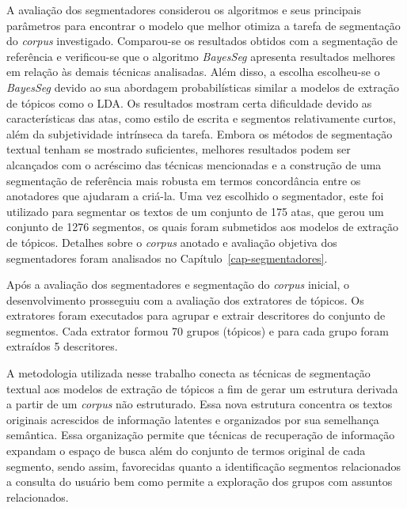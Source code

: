A avaliação dos segmentadores considerou os algoritmos e seus principais parâmetros para encontrar o modelo que melhor otimiza a tarefa de segmentação do \textit{corpus} investigado. Comparou-se os resultados obtidos com a segmentação de referência e verificou-se que o algoritmo \textit{BayesSeg} apresenta resultados melhores em relação às demais técnicas analisadas. Além disso, a escolha escolheu-se o \textit{BayesSeg} devido ao sua abordagem probabilísticas similar a modelos de extração de tópicos como o LDA. 
Os resultados mostram certa dificuldade devido as características das atas, como estilo de escrita e segmentos relativamente curtos, além da subjetividade intrínseca da tarefa.
Embora os métodos de segmentação textual tenham se mostrado suficientes, melhores resultados podem ser alcançados com o acréscimo das técnicas mencionadas e a construção de uma segmentação de referência mais robusta em termos concordância entre os anotadores que ajudaram a criá-la.
Uma vez escolhido o segmentador, este foi utilizado para segmentar os textos de um conjunto de 175 atas, que gerou um conjunto de 1276 segmentos, os quais foram submetidos aos modelos de extração de tópicos.
Detalhes sobre o \textit{corpus} anotado e avaliação objetiva dos segmentadores foram analisados no Capítulo~\ref{cap-segmentadores}.




Após a avaliação dos segmentadores e segmentação do \textit{corpus} inicial, o desenvolvimento prosseguiu com a avaliação dos extratores de tópicos. Os extratores foram executados para agrupar e extrair descritores do conjunto de segmentos. Cada extrator formou 70 grupos (tópicos) e para cada grupo foram extraídos 5 descritores. 

A metodologia utilizada nesse trabalho conecta as técnicas de segmentação textual aos modelos de extração de tópicos a fim de gerar um estrutura derivada a partir de um \textit{corpus} não estruturado. Essa nova estrutura concentra os textos originais acrescidos de informação latentes e organizados por sua semelhança semântica. Essa organização permite que técnicas de recuperação de informação expandam o espaço de busca além do conjunto de termos original de cada segmento, sendo assim, favorecidas quanto a identificação segmentos relacionados a consulta do usuário bem como permite a exploração dos grupos com assuntos relacionados.





